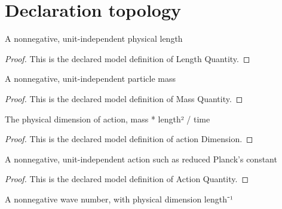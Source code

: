 \section{Declaration topology}
\begin{definition}
  \label{def:physics:phyx-mini-0602:phyxminiproblems-problemphyxmini0602-lengthquantity}
  A nonnegative, unit-independent physical length
\end{definition}
\begin{proof}
  This is the declared model definition of Length Quantity.
\end{proof}
\begin{definition}
  \label{def:physics:phyx-mini-0602:phyxminiproblems-problemphyxmini0602-massquantity}
  A nonnegative, unit-independent particle mass
\end{definition}
\begin{proof}
  This is the declared model definition of Mass Quantity.
\end{proof}
\begin{definition}
  \label{def:physics:phyx-mini-0602:phyxminiproblems-problemphyxmini0602-actiondimension}
  The physical dimension of action, mass * length² / time
\end{definition}
\begin{proof}
  This is the declared model definition of action Dimension.
\end{proof}
\begin{definition}
  \label{def:physics:phyx-mini-0602:phyxminiproblems-problemphyxmini0602-actionquantity}
  A nonnegative, unit-independent action such as reduced Planck's constant
\end{definition}
\begin{proof}
  This is the declared model definition of Action Quantity.
\end{proof}
\begin{definition}
  \label{def:physics:phyx-mini-0602:phyxminiproblems-problemphyxmini0602-wavenumberquantity}
  A nonnegative wave number, with physical dimension length⁻¹
\end{definition}
